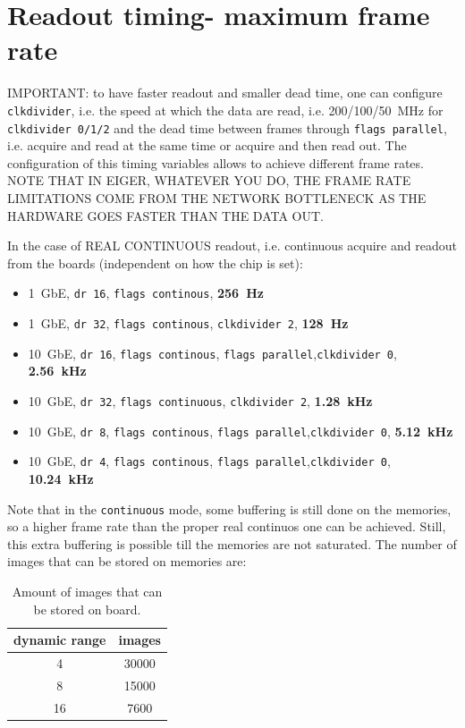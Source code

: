 \documentclass{article}
\begin{document}
\section{Readout timing- maximum frame rate}\label{timing}
IMPORTANT: to have faster readout and smaller dead time, one can configure {\tt{clkdivider}}, i.e. the speed at which the data are read, i.e. 200/100/50~MHz for {\tt{clkdivider 0/1/2}} and the dead time between frames through {\tt{flags parallel}}, i.e. acquire and read at the same time or acquire and then read out.
The configuration of this timing variables allows to achieve different frame rates. NOTE THAT IN EIGER, WHATEVER YOU DO, THE FRAME RATE LIMITATIONS COME FROM THE NETWORK BOTTLENECK AS THE HARDWARE GOES FASTER THAN THE DATA OUT.

In the case of REAL CONTINUOUS readout, i.e. continuous acquire and readout from the boards (independent on how the chip is set):
\begin{itemize}
\item 1~GbE, {\tt{dr 16}}, {\tt{flags continous}}, \textbf{256~Hz} 
\item 1~GbE, {\tt{dr 32}}, {\tt{flags continous}}, {\tt{clkdivider 2}}, \textbf{128~Hz}
\item 10~GbE, {\tt{dr 16}}, {\tt{flags continous}}, {\tt{flags parallel}},{\tt{clkdivider 0}}, \textbf{2.56~kHz}  
\item 10~GbE, {\tt{dr 32}}, {\tt{flags continuous}}, {\tt{clkdivider 2}}, \textbf{1.28~kHz}  
\item 10~GbE, {\tt{dr 8}}, {\tt{flags continous}}, {\tt{flags parallel}},{\tt{clkdivider 0}}, \textbf{5.12~kHz}
\item 10~GbE, {\tt{dr 4}}, {\tt{flags continous}}, {\tt{flags parallel}},{\tt{clkdivider 0}}, \textbf{10.24~kHz}
\end{itemize}
Note that in the {\tt{continuous}} mode, some buffering is still done on the memories, so a higher frame rate than the proper real continuos one can be achieved. Still, this extra buffering is possible till the memories are not saturated. 
The number of images that can be stored on memories are:
\begin{table}
\begin{tabular}{|c|c|}
\hline
dynamic range & images\\
\hline
4 & 30000\\
\hline
8 & 15000\\
\hline
16 & 7600\\
\hline
\end{tabular}
\caption{Amount of images that can be stored on board.}
\end{table}
\end{document}

